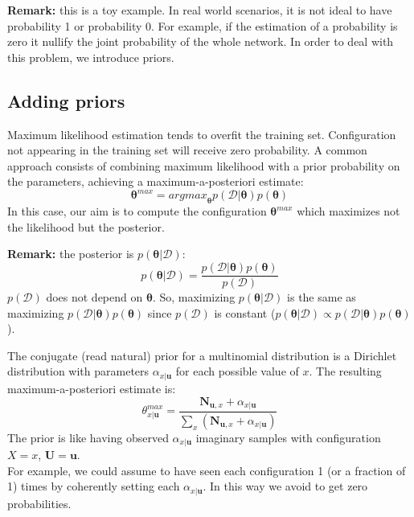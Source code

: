 \textbf{Remark:} this is a toy example. In real world scenarios, it is not ideal to have probability 1 or probability 0. For example, if the estimation of a probability is zero it nullify the joint probability of the whole network. In order to deal with this problem, we introduce priors.

\subsection{Adding priors}
Maximum likelihood estimation tends to overfit the training set. Configuration not appearing in the training set will receive zero probability. A common approach consists of combining maximum likelihood with a prior probability on the parameters, achieving a maximum-a-posteriori estimate:
\begin{equation}
    \pmb{\theta}^{\mathit{max}} = \mathit{argmax}_{\pmb{\theta}} p(\mathcal{D}|\pmb{\theta})p(\pmb{\theta})
\end{equation}
In this case, our aim is to compute the configuration $\pmb{\theta}^\mathit{max}$ which maximizes not the likelihood but the posterior. \newline

\textbf{Remark:} the posterior is $p(\pmb{\theta}|\mathcal{D})$:
$$p(\pmb{\theta}|\mathcal{D}) = \frac{p(\mathcal{D}|\pmb{\theta}) p(\pmb{\theta})}{p(\mathcal{D})}$$
$p(\mathcal{D})$ does not depend on $\pmb{\theta}$. So, maximizing $p(\pmb{\theta}|\mathcal{D})$ is the same as maximizing $p(\mathcal{D}|\pmb{\theta})p(\pmb{\theta})$ since $p(\mathcal{D})$ is constant ($p(\pmb{\theta}|\mathcal{D}) \propto p(\mathcal{D}|\pmb{\theta}) p(\pmb{\theta})$). \newline

The conjugate (read natural) prior for a multinomial distribution is a Dirichlet distribution with parameters $\alpha_{x|\pmb{u}}$ for each possible value of $x$. The resulting maximum-a-posteriori estimate is:
\begin{equation}
    \theta^{\mathit{max}}_{x|\pmb{u}} = \frac{\pmb{N}_{\pmb{u},x} + \alpha_{x|\pmb{u}}}{\sum_x (\pmb{N}_{\pmb{u},x} + \alpha_{x|\pmb{u}})}
\end{equation}
The prior is like having observed $\alpha_{x|\pmb{u}}$ imaginary samples with configuration $X=x$, $\pmb{U}=\pmb{u}$. \\
For example, we could assume to have seen each configuration 1 (or a fraction of 1) times by coherently setting each $\alpha_{x|\pmb{u}}$. In this way we avoid to get zero probabilities.

